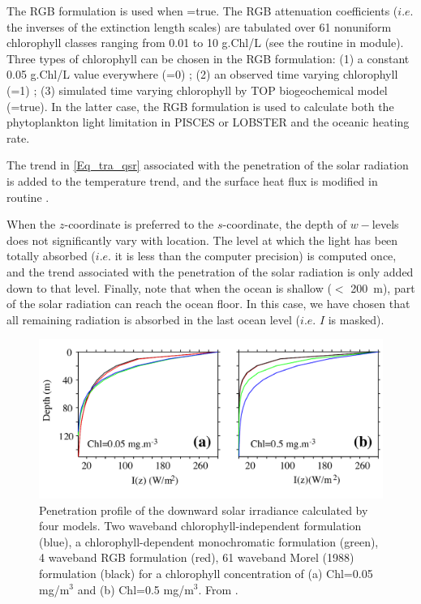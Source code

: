 The RGB formulation is used when =true. The RGB attenuation coefficients
($i.e.$ the inverses of the extinction length scales) are tabulated over 61 nonuniform 
chlorophyll classes ranging from 0.01 to 10 g.Chl/L (see the routine  
in  module). Three types of chlorophyll can be chosen in the RGB formulation:
(1) a constant 0.05 g.Chl/L value everywhere (=0) ; (2) an observed 
time varying chlorophyll (=1) ; (3) simulated time varying chlorophyll
by TOP biogeochemical model (=true). In the latter case, the RGB 
formulation is used to calculate both the phytoplankton light limitation in PISCES 
or LOBSTER and the oceanic heating rate. 

The trend in \eqref{Eq_tra_qsr} associated with the penetration of the solar radiation 
is added to the temperature trend, and the surface heat flux is modified in routine . 

When the $z$-coordinate is preferred to the $s$-coordinate, the depth of $w-$levels does 
not significantly vary with location. The level at which the light has been totally 
absorbed ($i.e.$ it is less than the computer precision) is computed once, 
and the trend associated with the penetration of the solar radiation is only added down to that level. 
Finally, note that when the ocean is shallow ($<$ 200~m), part of the 
solar radiation can reach the ocean floor. In this case, we have 
chosen that all remaining radiation is absorbed in the last ocean 
level ($i.e.$ $I$ is masked). 

\begin{figure}[!t] 	  \begin{center}
\includegraphics[width=1.0\textwidth]{./TexFiles/Figures/Fig_TRA_Irradiance.pdf}
\caption{ 	 \label{Fig_traqsr_irradiance}
Penetration profile of the downward solar irradiance calculated by four models. 
Two waveband chlorophyll-independent formulation (blue), a chlorophyll-dependent 
monochromatic formulation (green), 4 waveband RGB formulation (red), 
61 waveband Morel (1988) formulation (black) for a chlorophyll concentration of 
(a) Chl=0.05 mg/m$^3$ and (b) Chl=0.5 mg/m$^3$. From \citet{Lengaigne_al_CD07}.}
\end{center}   \end{figure}

